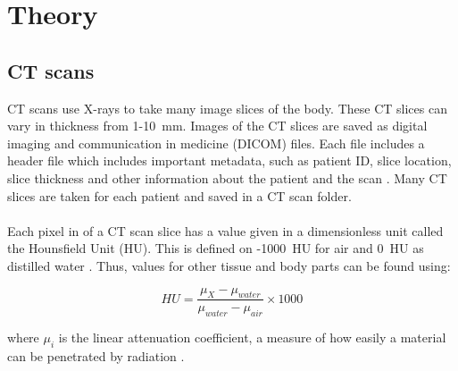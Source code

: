 \documentclass[12pt]{article}
\begin{document}
 

\section{Theory}
\subsection{CT scans}

\color{black}
CT scans use X-rays to take many image slices of the body. These CT slices can vary in thickness from \hbox{1-10 mm}. Images of the CT slices are saved as digital imaging and communication in medicine (DICOM) files. Each file includes a header file which includes important metadata, such as patient ID, slice location, slice thickness and other information about the patient and the scan \cite{Varma:2012aa}. Many CT slices are taken for each patient and saved in a CT scan folder.
\\ \\

 Each pixel in of a CT scan slice has a value given in a dimensionless unit called the Hounsfield Unit (HU). This is defined on \hbox{-1000 HU} for air and \hbox{0 HU} as distilled water \cite{hounsfield}. Thus, values for other tissue and body parts can be found using:
\begin{center}
\begin{equation}
   HU=\frac{\mu_X-\mu_{water}}{\mu_{water}-\mu_{air}}\times1000
   \label{hounsfield_equation}
\end{equation}
\end{center}

where $\mu_i$ is the linear attenuation coefficient, a measure of how easily a material can be penetrated by radiation \cite{Lamba:2014aa}. 
\\ \\


\end{document}
